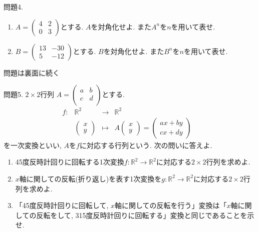\documentclass[dvipdfmx,a4paper,11pt]{article}
\newcommand{\R}{\mathbb{R}}
\theoremstyle{definition}
\begin{document}
  問題4.  
 \begin{enumerate}
   \setlength{\parskip}{0cm} %
  \setlength{\itemsep}{0cm} %
\item 
$
A=\begin{pmatrix} 4 & 2 \\ 0 & 3 \end{pmatrix}
$とする. $A$を対角化せよ. また$A^n$を$n$を用いて表せ. 
\item $
B=\begin{pmatrix} 13 & -30 \\ 5 & -12 \end{pmatrix}
$とする. $B$を対角化せよ. また$B^n$を$n$を用いて表せ. 
 \end{enumerate}
 
 \begin{flushright}
 {\Large 問題は裏面に続く}
 \end{flushright}

 \newpage
 
 問題5.   $2 \times 2$行列
$
A=\begin{pmatrix}
a& b \\
c& d \\
\end{pmatrix}
$とする. 
 $$
\begin{array}{ccccc}
f: &\R^2& \rightarrow & \R^2& \\
&\begin{pmatrix}
x \\ y
 \end{pmatrix} & \longmapsto & 
A
\begin{pmatrix}
x \\ y
 \end{pmatrix}  = 
 \begin{pmatrix}
ax + by \\ cx + dy
 \end{pmatrix}
 &
\end{array}
$$
を一次変換といい, $A$を$f$に対応する行列という. 次の問いに答えよ. 
  \begin{enumerate}
   \setlength{\parskip}{0cm} %
  \setlength{\itemsep}{0cm} %
  \item 45度反時計回りに回転する1次変換$f: \R^2 \to \R^2$に対応する$2 \times 2$行列を求めよ. 
  \item $x$軸に関しての反転(折り返し)を表す1次変換を$g : \R^2 \to \R^2$に対応する$2 \times 2$行列を求めよ.
  \item 「45度反時計回りに回転して, $x$軸に関しての反転を行う」変換は「$x$軸に関しての反転をして, 315度反時計回りに回転する」変換と同じであることを示せ. 
  
  \end{enumerate}
 
\end{document}
